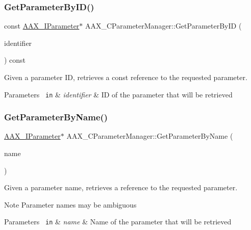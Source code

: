 \subsubsection{\texorpdfstring{GetParameterByID()}{GetParameterByID()}\hspace{0.1cm}{\footnotesize\ttfamily [2/2]}}
{\footnotesize\ttfamily const \mbox{\hyperlink{a01857}{A\+A\+X\+\_\+\+I\+Parameter}}$\ast$ A\+A\+X\+\_\+\+C\+Parameter\+Manager\+::\+Get\+Parameter\+By\+ID (\begin{DoxyParamCaption}\item[{\mbox{\hyperlink{a00392_a1440c756fe5cb158b78193b2fc1780d1}{A\+A\+X\+\_\+\+C\+Param\+ID}}}]{identifier }\end{DoxyParamCaption}) const}



Given a parameter ID, retrieves a const reference to the requested parameter. 


\begin{DoxyParams}[1]{Parameters}
\mbox{\texttt{ in}}  & {\em identifier} & ID of the parameter that will be retrieved \\
\hline
\end{DoxyParams}
\mbox{\label{a01545_a65819f05cca51224d92ac0b620d2b354}} 
\subsubsection{\texorpdfstring{GetParameterByName()}{GetParameterByName()}\hspace{0.1cm}{\footnotesize\ttfamily [1/2]}}
{\footnotesize\ttfamily \mbox{\hyperlink{a01857}{A\+A\+X\+\_\+\+I\+Parameter}}$\ast$ A\+A\+X\+\_\+\+C\+Parameter\+Manager\+::\+Get\+Parameter\+By\+Name (\begin{DoxyParamCaption}\item[{const char $\ast$}]{name }\end{DoxyParamCaption})}



Given a parameter name, retrieves a reference to the requested parameter. 

\begin{DoxyNote}{Note}
Parameter names may be ambiguous
\end{DoxyNote}

\begin{DoxyParams}[1]{Parameters}
\mbox{\texttt{ in}}  & {\em name} & Name of the parameter that will be retrieved \\
\hline
\end{DoxyParams}
\mbox{\label{a01545_aa5df52599721038b86b9c3bcf57b53e8}} 
